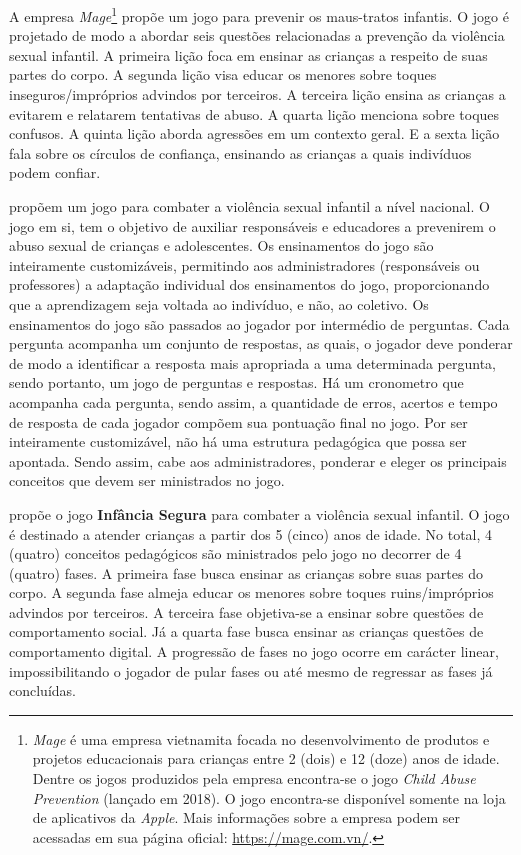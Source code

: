 A empresa \textit{Mage}\footnote{\textit{Mage} é uma empresa vietnamita focada no desenvolvimento de produtos e projetos educacionais para crianças entre 2 (dois) e 12 (doze) anos de idade. Dentre os jogos produzidos pela empresa encontra-se o jogo \textit{Child Abuse Prevention} (lançado em 2018). O jogo encontra-se disponível somente na loja de aplicativos da \textit{Apple}. Mais informações sobre a empresa podem ser acessadas em sua página oficial: \url{https://mage.com.vn/}.} propõe um jogo para prevenir os maus-tratos infantis. O jogo é projetado de modo a abordar seis questões relacionadas a prevenção da violência sexual infantil. A primeira lição foca em ensinar as crianças a respeito de suas partes do corpo. A segunda lição visa educar os menores sobre toques inseguros/impróprios advindos por terceiros. A terceira lição ensina as crianças a evitarem e relatarem tentativas de abuso. A quarta lição menciona sobre toques confusos. A quinta lição aborda agressões em um contexto geral. E a sexta lição fala sobre os círculos de confiança, ensinando as crianças a quais indivíduos podem confiar.

 propõem um jogo para combater a violência sexual infantil a nível nacional. O jogo em si, tem o objetivo de auxiliar responsáveis e educadores a prevenirem o abuso sexual de crianças e adolescentes. Os ensinamentos do jogo são inteiramente customizáveis, permitindo aos administradores (responsáveis ou professores) a adaptação individual dos ensinamentos do jogo, proporcionando que a aprendizagem seja voltada ao indivíduo, e não, ao coletivo. Os ensinamentos do jogo são passados ao jogador por intermédio de perguntas. Cada pergunta acompanha um conjunto de respostas, as quais, o jogador deve ponderar de modo a identificar a resposta mais apropriada a uma determinada pergunta, sendo portanto, um jogo de perguntas e respostas. Há um cronometro que acompanha cada pergunta, sendo assim, a quantidade de erros, acertos e tempo de resposta de cada jogador compõem sua pontuação final no jogo. Por ser inteiramente customizável, não há uma estrutura pedagógica que possa ser apontada. Sendo assim, cabe aos administradores, ponderar e eleger os principais conceitos que devem ser ministrados no jogo.

 propõe o jogo \textbf{Infância Segura} para combater a violência sexual infantil. O jogo é destinado a atender crianças a partir dos 5 (cinco) anos de idade. No total, 4 (quatro) conceitos pedagógicos são ministrados pelo jogo no decorrer de 4 (quatro) fases. A primeira fase busca ensinar as crianças sobre suas partes do corpo. A segunda fase almeja educar os menores sobre toques ruins/impróprios advindos por terceiros. A terceira fase objetiva-se a ensinar sobre questões de comportamento social. Já a quarta fase busca ensinar as crianças questões de comportamento digital. A progressão de fases no jogo ocorre em carácter linear, impossibilitando o jogador de pular fases ou até mesmo de regressar as fases já concluídas. 

